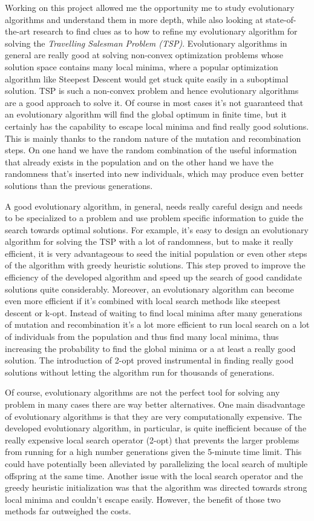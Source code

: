 \documentclass[a4paper,10pt]{article}
\begin{document}
Working on this project allowed me the opportunity me to study evolutionary algorithms and understand them in more depth, while also looking at state-of-the-art research to find clues as to how to refine my evolutionary algorithm for solving the \textit{Travelling Salesman Problem (TSP)}. Evolutionary algorithms in general are really good at solving non-convex optimization problems whose solution space contains many local minima, where a popular optimization algorithm like Steepest Descent would get stuck quite easily in a suboptimal solution. TSP is such a non-convex problem and hence evolutionary algorithms are a good approach to solve it. Of course in most cases it's not guaranteed that an evolutionary algorithm will find the global optimum in finite time, but it certainly has the capability to escape local minima and find really good solutions. This is mainly thanks to the random nature of the mutation and recombination steps. On one hand we have the random combination of the useful information that already exists in the population and on the other hand we have the randomness that's inserted into new individuals, which may produce even better solutions than the previous generations.

A good evolutionary algorithm, in general, needs really careful design and needs to be specialized to a problem and use problem specific information to guide the search towards optimal solutions. For example, it's easy to design an evolutionary algorithm for solving the TSP with a lot of randomness, but to make it really efficient, it is very advantageous to seed the initial population or even other steps of the algorithm with greedy heuristic solutions. This step proved to improve the efficiency of the developed algorithm and speed up the search of good candidate solutions quite considerably. Moreover, an evolutionary algorithm can become even more efficient if it's combined with local search methods like steepest descent or k-opt. Instead of waiting to find local minima after many generations of mutation and recombination it's a lot more efficient to run local search on a lot of individuals from the population and thus find many local minima, thus increasing the probability to find the global minima or a at least a really good solution. The introduction of 2-opt proved instrumental in finding really good solutions without letting the algorithm run for thousands of generations.

Of course, evolutionary algorithms are not the perfect tool for solving any problem in many cases there are way better alternatives. One main disadvantage of evolutionary algorithms is that they are very computationally expensive. The developed evolutionary algorithm, in particular, is quite inefficient because of the really expensive local search operator (2-opt) that prevents the larger problems from running for a high number generations given the 5-minute time limit. This could have potentially been alleviated by parallelizing the local search of multiple offspring at the same time. Another issue with the local search operator and the greedy heuristic initialization was that the algorithm was directed towards strong local minima and couldn't escape easily. However, the benefit of those two methods far outweighed the costs.
\end{document}

